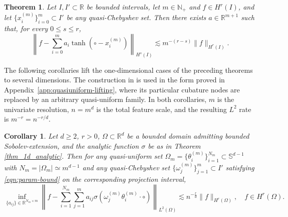 \documentclass{article}
\numberwithin{equation}{section}
\newtheorem{theorem}{Theorem}
\newtheorem{corollary}{Corollary}
\def\NN{\mathbb{N}}
\def\RR{\mathbb{R}}
\def\SS{\mathbb{S}}
\def\lt{\left}
\def\rt{\right}
\begin{document}
\begin{theorem}\label{thm_main_1d}
Let $I,I'\subset \RR$ be bounded intervals, let $m\in\NN_+$ and $f\in H^r(I)$, and let $\{x_i^{(m)}\}_{i=0}^m\subset I'$ be any quasi-Chebyshev set. Then there exists $a\in\RR^{m+1}$ such that, for every $0\leq s\leq r$,
    \begin{equation}
        \lt\|f - \sum_{i=0}^{m} a_i\tanh(\circ-x_i^{(m)})\rt\|_{H^s(I)}\lesssim m^{-(r-s)} \|f\|_{H^r(I)}.
    \end{equation}
\end{theorem}

The following corollaries lift the one-dimensional cases of the preceding theorems to several dimensions. The construction in \cite{petrushev1998approximation} is used in the form proved in Appendix~\ref{app:quasiuniform-lifting}, where its particular cubature nodes are replaced by an arbitrary quasi-uniform family. In both corollaries, $m$ is the univariate resolution, $n=m^d$ is the total feature scale, and the resulting $L^2$ rate is $m^{-r}=n^{-r/d}$.

\begin{corollary}\label{cor_smooth_act_d}
    Let $d\geq2$, $r>0$, $\Omega\subset\RR^d$ be a bounded domain admitting bounded Sobolev-extension, and the analytic function $\sigma$ be as in Theorem \ref{thm_1d_analytic}. Then for any quasi-uniform set $\Omega_m=\{\theta_i^{(m)}\}_{i=1}^{N_m}\subset \SS^{d-1}$ with $N_m=|\Omega_m|\simeq m^{d-1}$ and any quasi-Chebyshev set $\{\omega_j^{(m)}\}_{j=1}^{m}\subset I'$ satisfying \eqref{eqn:param-bound} on the corresponding projection interval,
    \begin{equation}
        \inf\limits_{\{a_{ij}\}\in\RR^{N_m\times m}}\lt\|f - \sum_{i=1}^{N_m}\sum_{j=1}^m a_{ij}\sigma \lt(\omega_j^{(m)}\theta_i^{(m)}\cdot\circ \rt)\rt\|_{L^2(\Omega)}\lesssim n^{-\frac{r}{d}} \|f\|_{H^r(\Omega)},\quad f\in H^r(\Omega).
    \end{equation}
\end{corollary}
\end{document}
